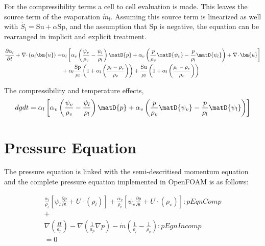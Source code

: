 \documentclass{article}
\begin{document}
For the compressibility terms a cell to cell evaluation is made. This leaves the source term of the evaporation $\dot{m}_l$. Assuming this source term is linearized as well with $\dot{S_l} = \mathrm{Su} + \alpha \mathrm{Sp}$, and the assumption that Sp is negative, the equation can be rearranged in implicit and explicit treatment.

\begin{equation}
\begin{split}
\frac{\partial \alpha_l}{\partial t} + \nabla\cdotp (\alpha_l \bm{u}) =& \alpha_l\left[\alpha_v\left(\frac{\psi_v}{\rho_v}-\frac{\psi_l}{\rho_l}\right)\matD{p}  + \alpha_v\left(\frac{p}{\rho_v}\matD{\psi_v}-\frac{p}{\rho_l}\matD{\psi_l}\right) + \nabla\cdotp\bm{u}\right] \\
& + \alpha_l\frac{\mathrm{Sp}}{\rho_l}\left(1+\alpha_l \left(\frac{\rho_l-\rho_v}{\rho_v}\right)\right)
+ \frac{\mathrm{Su}}{\rho_l}\left(1+\alpha_l \left(\frac{\rho_l-\rho_v}{\rho_v}\right)\right)
\end{split}
\end{equation}

The compressibility and temperature effects,
\begin{equation*}
dgdt = \alpha_l\left[\alpha_v\left(\frac{\psi_v}{\rho_v}-\frac{\psi_l}{\rho_l}\right)\matD{p}  + \alpha_v\left(\frac{p}{\rho_v}\matD{\psi_v}-\frac{p}{\rho_l}\matD{\psi_l}\right)\right]
\end{equation*}

\section{Pressure Equation}

The pressure equation is linked with the semi-descritised momentum equation and the complete pressure equation implemented in OpenFOAM is as follows:

\begin{equation}
\begin{split}
	\frac{\alpha_l}{\rho_l}\left[\psi_l\frac{{\partial}p}{{\partial}t} + U \cdot(\rho_l)\right] + \frac{\alpha_v}{\rho_v}\left[\psi_v\frac{{\partial}p}{{\partial}t} + U \cdot(\rho_v)\right]: pEqnComp \\
	+ \\
	\nabla\left(\frac{H}{a_p}\right) - \nabla\left(\frac{1}{a_p}{\nabla}p\right) - \dot{m}\left(\frac{1}{\rho_l}-\frac{1}{\rho_v}\right): pEgnIncomp \\
	= 0
\end{split}
\end{equation}
\end{document}
